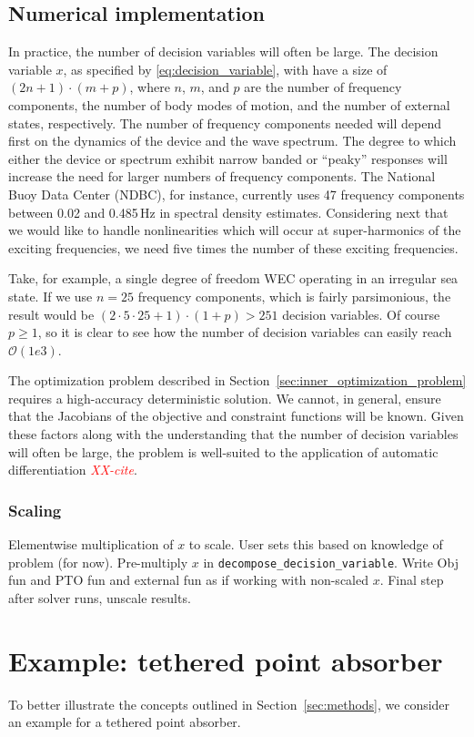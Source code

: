 \documentclass[]{article}
\newcommand{\todo}[1]{\textcolor{red}{\emph{#1}}}
\begin{document}
\subsection{Numerical implementation}\label{sec:numericalImplementation}
In practice, the number of decision variables will often be large.
The decision variable $x$, as specified by \eqref{eq:decision_variable}, with have a size of $(2n + 1) \cdot (m + p)$, where $n$, $m$, and $p$ are the number of frequency components, the number of body modes of motion, and the number of external states, respectively.
The number of frequency components needed will depend first on the dynamics of the device and the wave spectrum.
The degree to which either the device or spectrum exhibit narrow banded or ``peaky'' responses will increase the need for larger numbers of frequency components.
The National Buoy Data Center (NDBC), for instance, currently uses 47 frequency components between 0.02 and 0.485\,Hz in spectral density estimates.
Considering next that we would like to handle nonlinearities which will occur at super-harmonics of the exciting frequencies, we need five times the number of these exciting frequencies.

Take, for example, a single degree of freedom WEC operating in an irregular sea state.
If we use $n=25$ frequency components, which is fairly parsimonious, the result would be $(2\cdot 5 \cdot 25 + 1) \cdot (1 + p) > 251$ decision variables.
Of course $p \geq 1$, so it is clear to see how the number of decision variables can easily reach $\mathcal{O}(1e3)$.

The optimization problem described in Section~\ref{sec:inner_optimization_problem} requires a high-accuracy deterministic solution.
We cannot, in general, ensure that the Jacobians of the objective and constraint functions will be known.
Given these factors along with the understanding that the number of decision variables will often be large, the problem is well-suited to the application of automatic differentiation \todo{XX-cite}.

\subsubsection{Scaling}\label{sec:scaling}

Elementwise multiplication of $x$ to scale.
User sets this based on knowledge of problem (for now).
Pre-multiply $x$ in \texttt{decompose\_decision\_variable}.
Write Obj fun and PTO fun and external fun as if working with non-scaled $x$.
Final step after solver runs, unscale results.

\section{Example: tethered point absorber}\label{sec:example_tethered_point_absorber}

To better illustrate the concepts outlined in Section~\ref{sec:methods}, we consider an example for a tethered point absorber.

\end{document}
